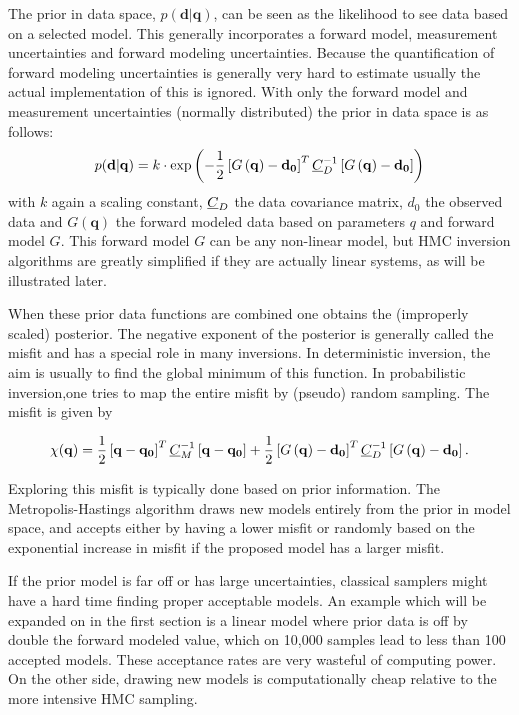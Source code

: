 The prior in data space, $p(\mathbf{d}|\mathbf{q}) $, can be seen as the likelihood to see data based on a selected model. This generally incorporates a forward model, measurement uncertainties and forward modeling uncertainties. Because the quantification of forward modeling uncertainties is generally very hard to estimate usually the actual implementation of this is ignored. With only the forward model and measurement uncertainties (normally distributed) the prior in data space is as follows:
\begin{gather}
	p(\mathbf{d}|\mathbf{q}) =  k \cdot \exp{\left( -\frac{1}{2} \left[ G\left(\mathbf{q}\right) -\mathbf{d_0}\right]^T \ensuremath{\underline{C}}_D ^{-1}\left[G\left(\mathbf{q}\right) -  \mathbf{d_0}\right]\right)}
\end{gather}
with $k$ again a scaling constant, $\underline{C}_D$ the data covariance matrix, $d_0$ the observed data and $G\left(\mathbf{q}\right)$ the forward modeled data based on parameters $q$ and forward model $G$. This forward model $G$ can be any non-linear model, but \gls{HMC} inversion algorithms are greatly simplified if they are actually linear systems, as will be illustrated later.

When these prior data functions are combined one obtains the (improperly scaled) posterior. The negative exponent of the posterior is generally called the misfit and has a special role in many inversions. In deterministic inversion, the aim is usually to find the global minimum of this function. In probabilistic inversion,one tries to map the entire misfit by (pseudo) random sampling. The misfit is given by

\begin{gather}
	\chi(\mathbf{q}) = \frac{1}{2} \left[ \mathbf{q} -\mathbf{q_0}\right]^T \underline{C}_M ^{-1}\left[ \mathbf{q} -  \mathbf{q_0}\right] + \frac{1}{2} \left[ G\left(\mathbf{q}\right) -\mathbf{d_0}\right]^T \underline{C}_D ^{-1}\left[G\left(\mathbf{q}\right) -  \mathbf{d_0}\right].
\end{gather}

Exploring this misfit is typically done based on prior information. The Metropolis-Hastings algorithm draws new models entirely from the prior in model space, and accepts either by having a lower misfit or randomly based on the exponential increase in misfit if the proposed model has a larger misfit.

If the prior model is far off or has large uncertainties, classical samplers might have a hard time finding proper acceptable models. An example which will be expanded on in the first section is a linear model where prior data is off by double the forward modeled value, which on 10,000 samples lead to less than 100 accepted models. These acceptance rates are very wasteful of computing power. On the other side, drawing new models is computationally cheap relative to the more intensive \gls{HMC} sampling.

